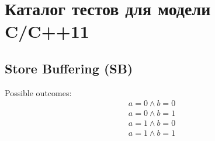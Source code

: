 \newcommand{\mpTemplate}[6]{
\begin{minipage}[t]{0.3\linewidth}
\vspace{-.2cm}
\begin{equation*}
\begin{tabular}{c}
  $\writeInstParam{#1}{f}{0}; \writeInstParam{#2}{d}{0};$ \\
\begin{tabular}{L || L}
  \writeInstParam{#3}{d}{5}  & \repeatReadInst{#5}{f} \\
  \writeInstParam{#4}{f}{1}; & \readInstParam{#6}{a}{d}; \\
\end{tabular}
\end{tabular}
\end{equation*}
\end{minipage}
}

\newcommand{\lbJoinTemplate}[4]{
\begin{minipage}[t]{0.3\linewidth}
\vspace{-.2cm}
\begin{equation*}
\begin{tabular}{c}
  $\writeInstParam{\rlx}{x}{0}; \writeInstParam{\rlx}{y}{0};$ \\
\begin{tabular}{L || L || L || L}
  \readInstParam{#1}{a}{y}; & \skipc & \readInstParam{#3}{b}{x}; & \skipc \\
  \writeInstParam{\rlx}{z1}{a} & & \writeInstParam{\rlx}{z2}{b} &  \\
  \multicolumn{2}{c ||}{$\writeInstParam{#2}{x}{1}$} &
  \multicolumn{2}{c}{$\writeInstParam{#4}{y}{1}$} \\
\end{tabular}
\end{tabular}
\end{equation*}
\end{minipage}
}

\chapter{Каталог тестов для модели C/C++11}
\label{sec:litmusTests}

\section{Store Buffering (SB)}
\label{app:sb}

%
\begin{minipage}[t]{0.3\linewidth}
Possible outcomes:\\
\[\begin{array}{l}
a = 0 \land b = 0\\
a = 0 \land b = 1\\
a = 1 \land b = 0\\
a = 1 \land b = 1\\
\end{array}\]
\end{minipage}
%
\sbTemplate{\rel}{\rel}{\rel}{\acq}{\rel}{\acq}
\litmusTestEnd


